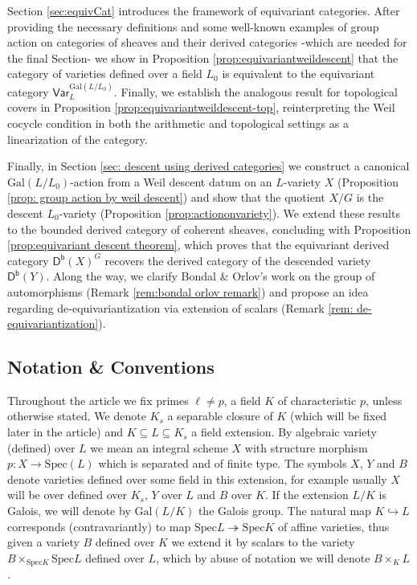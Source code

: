 \documentclass[10pt]{amsart}
\theoremstyle{definition}
\newcommand{\Spe}{ {\mathrm{Spec} } }
\newcommand{\Gal}{{ \mathrm{Gal}}}
\begin{document}
Section \ref{sec:equivCat} introduces the framework of equivariant categories. After providing the necessary definitions and some well-known examples of group action on categories of sheaves and their derived categories -which are needed for the final Section- we show in Proposition \ref{prop:equivariantweildescent} that the category of varieties defined over a field $L_0$ is equivalent to the equivariant category $\mathsf{Var}_L^{\Gal(L/L_0)}$. Finally, we establish the analogous result for topological covers in Proposition \ref{prop:equivariantweildescent-top}, reinterpreting the Weil cocycle condition in both the arithmetic and topological settings as a linearization of the category.

Finally, in Section \ref{sec: descent using derived categories} we construct a canonical $\Gal(L/L_0)$-action from a Weil descent datum on an $L$-variety $X$ (Proposition \ref{prop: group action by weil descent}) and show that the quotient $X/G$ is the descent $L_0$-variety (Proposition \ref{prop:actiononvariety}). We extend these results to the bounded derived category of coherent sheaves, concluding with Proposition \ref{prop:equivariant descent theorem}, which proves that the equivariant derived category $\mathsf{D^b}(X)^G$ recovers the derived category of the descended variety $\mathsf{D^b}(Y)$. Along the way, we clarify Bondal \& Orlov's work on the group of automorphisms (Remark \ref{rem:bondal orlov remark}) and propose an idea regarding de-equivariantization via extension of scalars (Remark \ref{rem: de-equivariantization}).





\subsection*{Notation \& Conventions}
Throughout the article we fix primes $\ell \neq p$, a field $K$ of characteristic $p$, unless otherwise stated. We denote $K_s$ a separable closure of $K$ (which will be fixed later in the article) and $K \subseteq L \subseteq K_s$ a field extension. 
By algebraic variety (defined) over $L$ we mean an integral scheme $X$ with structure morphism $p\colon X \to \Spe(L)$ which is separated and of finite type.
The symbols $X$, $Y$ and $B$ denote varieties defined over some field in this extension, for example usually $X$ will be over defined over $K_s$, $Y$ over $L$ and $B$ over $K$.
If the extension $L/K$ is Galois, we will denote by $\Gal (L/K)$ the Galois group.
The natural map $K \hookrightarrow L$ corresponds (contravariantly) to map $\Spe L \twoheadrightarrow \Spe K$ of affine varieties, thus given a variety $B$ defined over $K$ we extend it by scalars to the variety $B \times_{\Spe K} \Spe L$ defined over $L$, which by abuse of notation we will denote $B \times_K L$.
\end{document}
